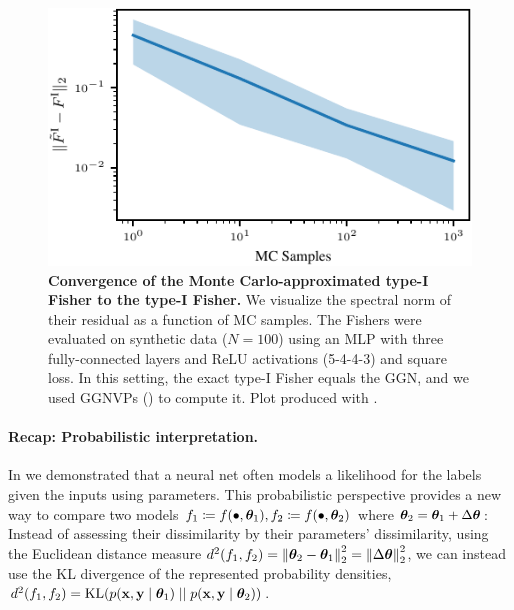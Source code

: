 \switchcolumn[1]

\begin{figure}[!h]
  \centering
  \includegraphics[width=\linewidth]{../kfs/plots/synthetic_rvec_diff_spec_norm.pdf}
  \caption{ \textbf{Convergence of the Monte Carlo-approximated type-I Fisher to the type-I Fisher.}
    We visualize the spectral norm of their residual as a function of MC samples.
    The Fishers were evaluated on synthetic data ($N=100$) using an MLP with three fully-connected layers and ReLU activations (5-4-4-3) and square loss.
    In this setting, the exact type-I Fisher equals the GGN, and we used GGNVPs () to compute it.
    Plot produced with .
  }\label{fig:mc-fisher-converges-to-fisher}
\end{figure}

\switchcolumn[0]

\paragraph{Recap: Probabilistic interpretation.}
In  we demonstrated that a neural net often models a likelihood for the labels given the inputs using parameters.
This probabilistic perspective provides a new way to compare two models $f_1 \coloneq f(\bullet, {\bm{\theta}}_1), f_2 \coloneq f(\bullet, {\bm{\theta}}_{2})$ where ${\bm{\theta}}_2 = {\bm{\theta}}_1 + \Delta {\bm{\theta}}$: Instead of assessing their dissimilarity by their parameters' dissimilarity, \eg using the Euclidean distance measure $d^2(f_1, f_2) = \left\lVert {\bm{\theta}}_2 - {\bm{\theta}}_1 \right\rVert_2^2 = \left\lVert \Delta {\bm{\theta}} \right\rVert_2^2$, we can instead use the KL divergence of the represented probability densities, $d^2(f_1, f_2) = \mathrm{KL}(p({\mathbf{x}}, {\mathbf{y}} \mid {\bm{\theta}}_1) \mid\mid p({\mathbf{x}}, {\mathbf{y}} \mid {\bm{\theta}}_2))$.

